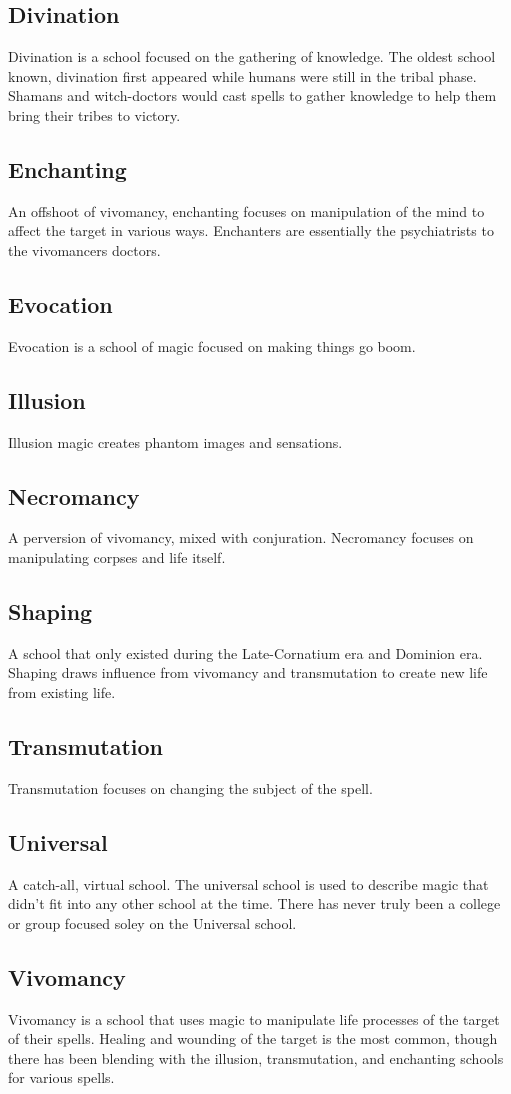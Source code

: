 \documentclass{article}
\begin{document}
\subsection{Divination}
Divination is a school focused on the gathering of knowledge. The oldest school known, divination first appeared while humans were still in the tribal phase. Shamans and witch-doctors would cast spells to gather knowledge to help them bring their tribes to victory.

\subsection{Enchanting}
An offshoot of vivomancy, enchanting focuses on manipulation of the mind to affect the target in various ways. Enchanters are essentially the psychiatrists to the vivomancers doctors.

\subsection{Evocation}
Evocation is a school of magic focused on making things go boom.

\subsection{Illusion}
Illusion magic creates phantom images and sensations.

\subsection{Necromancy}
A perversion of vivomancy, mixed with conjuration. Necromancy focuses on manipulating corpses and life itself.

\subsection{Shaping}
A school that only existed during the Late-Cornatium era and Dominion era. Shaping draws influence from vivomancy and transmutation to create new life from existing life.

\subsection{Transmutation}
Transmutation focuses on changing the subject of the spell.

\subsection{Universal}
A catch-all, virtual school. The universal school is used to describe magic that didn't fit into any other school at the time. There has never truly been a college or group focused soley on the Universal school.

\subsection{Vivomancy}
Vivomancy is a school that uses magic to manipulate life processes of the target of their spells. Healing and wounding of the target is the most common, though there has been blending with the illusion, transmutation, and enchanting schools for various spells.
\end{document}
